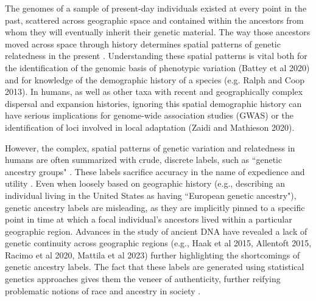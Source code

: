 The genomes of a sample of present-day individuals existed at every point in the past, 
scattered across geographic space and contained within the ancestors 
from whom they will eventually inherit their genetic material.
The way those ancestors moved across space through history 
determines spatial patterns of genetic relatedness in the present \citep{Bradburd_Ralph_2019}.
Understanding these spatial patterns is vital both for 
the identification of the genomic basis of phenotypic variation (Battey et al 2020)
and for knowledge of the demographic history of a species (e.g. Ralph and Coop 2013).
In humans, 
as well as other taxa with recent and geographically complex 
dispersal and expansion histories, 
ignoring this spatial demographic history can have serious implications 
for genome-wide association studies (GWAS) 
or the identification of loci involved in local adaptation
(Zaidi and Mathieson 2020).

However, the complex, spatial patterns of genetic variation 
and relatedness in humans 
are often summarized with crude, discrete labels, 
such as ``genetic ancestry groups" \citep{Coop_2022}.  
These labels sacrifice accuracy in the name of expedience and utility 
\citep{Lewis_etal_2022}.
Even when loosely based on geographic history 
(e.g., describing an individual living in the United States as having 
``European genetic ancestry"), 
genetic ancestry labels are misleading, 
as they are implicitly pinned to a specific point in time 
at which a focal individual's ancestors lived within a particular geographic region. 
Advances in the study of ancient DNA have revealed a lack of 
genetic continuity across geographic regions 
(e.g., Haak et al 2015, Allentoft 2015, Racimo et al 2020, Mattila et al 2023)
further highlighting the shortcomings of genetic ancestry labels.
The fact that these labels are generated using 
statistical genetics approaches gives them the veneer of authenticity, 
further reifying problematic notions of race and ancestry in society 
\citep{Lewis_etal_2022, Carlson_etal_2022}.

